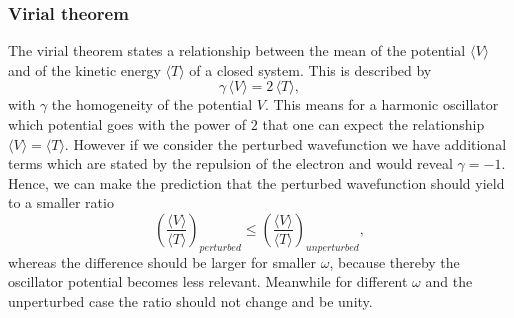 \subsubsection{Virial theorem}
The virial theorem states a relationship between the mean of the potential $\langle V \rangle$ and of the kinetic energy $\langle T \rangle$ of a closed system. This is described by
\begin{equation}
    \gamma \, \langle V \rangle = 2\, \langle T \rangle,
\end{equation}
with $\gamma$ the homogeneity of the potential $V$. This means for a harmonic oscillator which potential goes with the power of $2$ that one can expect the relationship $\langle V \rangle = \langle T \rangle$. However if we consider the perturbed wavefunction we have additional terms which are stated by the repulsion of the electron and would reveal $\gamma = -1$. Hence, we can make the prediction that the perturbed wavefunction should yield to a smaller ratio 
\begin{equation}
\left(\frac{\langle V \rangle}{\langle T \rangle}\right)_{perturbed} \leq \left(\frac{\langle V \rangle}{\langle T \rangle}\right)_{unperturbed},
\end{equation}
whereas the difference should be larger for smaller $\omega$, because thereby the oscillator potential becomes less relevant. Meanwhile for different $\omega$ and the unperturbed case the ratio should not change and be unity.


